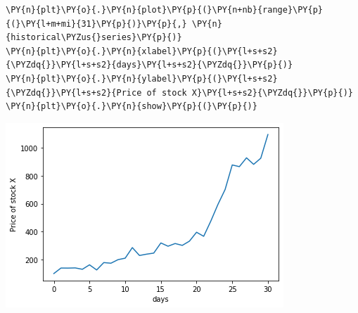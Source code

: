 \begin{Answer}
\begin{tcolorbox}[size=fbox, boxrule=1pt, colback=cellbackground, colframe=cellborder]
\begin{Verbatim}[commandchars=\\\{\}]
\PY{n}{plt}\PY{o}{.}\PY{n}{plot}\PY{p}{(}\PY{n+nb}{range}\PY{p}{(}\PY{l+m+mi}{31}\PY{p}{)}\PY{p}{,} \PY{n}{historical\PYZus{}series}\PY{p}{)}
\PY{n}{plt}\PY{o}{.}\PY{n}{xlabel}\PY{p}{(}\PY{l+s+s2}{\PYZdq{}}\PY{l+s+s2}{days}\PY{l+s+s2}{\PYZdq{}}\PY{p}{)}
\PY{n}{plt}\PY{o}{.}\PY{n}{ylabel}\PY{p}{(}\PY{l+s+s2}{\PYZdq{}}\PY{l+s+s2}{Price of stock X}\PY{l+s+s2}{\PYZdq{}}\PY{p}{)}
\PY{n}{plt}\PY{o}{.}\PY{n}{show}\PY{p}{(}\PY{p}{)}
\end{Verbatim}
\end{tcolorbox}
\vspace{5.5cm}
\begin{center}
  \includegraphics{figures/lesson6_solutions_5_0.png}
\end{center}
\end{Answer}
